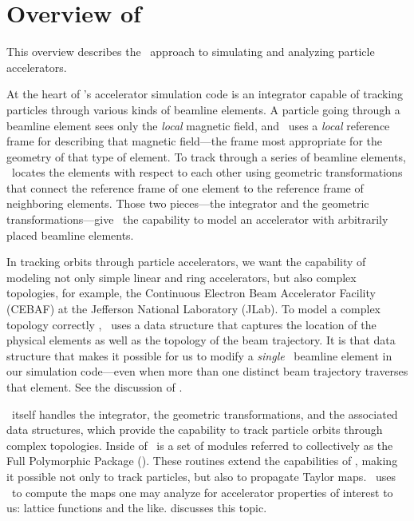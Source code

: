 
\chapter{Overview of \PTC}
\label{cha:overview}


%
This overview describes the \PTC\ approach to simulating and analyzing
particle accelerators.

At the heart of \PTC's accelerator simulation code is an integrator
capable of tracking particles through various kinds of beamline
elements.  A particle going through a beamline element sees only the
\emph{local} magnetic field, and \PTC\ uses a \emph{local} reference
frame for describing that magnetic field---the frame most appropriate
for the geometry of that type of element.  To track through a series
of beamline elements, \PTC\ locates the elements with respect to each
other using geometric transformations that connect the reference frame
of one element to the reference frame of neighboring elements. Those
two pieces---the integrator and the geometric transformations---give
\PTC\ the capability to model an accelerator with arbitrarily placed
beamline elements.

In tracking orbits through particle accelerators, we want the capability
of modeling not only simple linear and ring accelerators, but also complex
topologies, for example, the Continuous Electron Beam Accelerator Facility
(CEBAF) at the Jefferson National Laboratory (JLab).  To model a complex
topology correctly%
,
\PTC\ uses a data structure that captures the location of the physical
elements as well as the topology of the beam trajectory.  It is that
data structure that makes it possible for us to modify a \emph{single}
\PTC\ beamline element in our simulation code---even when more than one
distinct beam trajectory traverses that element. See the discussion of
.

\PTC\ itself handles the integrator, the geometric transformations, and
the associated data structures, which provide the capability to track
particle orbits through complex topologies.  Inside of \PTC\ is a set
of modules referred to collectively as the Full Polymorphic Package
(\FPP).%
\cite{Forest:2006:FPP.PTC,Forest:2006:FPPDoc}
These routines extend the capabilities of \PTC, making it possible
not only to track particles, but also to propagate Taylor maps. \PTC\ uses
\FPP\ to compute the maps one may analyze for accelerator properties
of interest to us: lattice functions and the like.
 discusses this topic.

